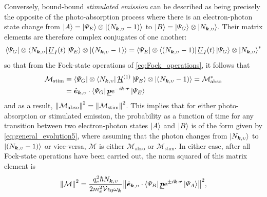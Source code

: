 Conversely, bound-bound \emph{stimulated emission} can be described as being precisely the opposite of the photo-absorption process where there is an electron-photon state change from $\ket{A} = \ket{\Psi_E} \otimes \ket{\left( N_{\mathbold{k},\upsilon} -1 \right)}$ to $\ket{B} = \ket{\Psi_G} \otimes \ket{N_{\mathbold{k},\upsilon}}$. 
Their matrix elements are therefore complex conjugates of one another:
\begin{equation}
\bra{\Psi_G} \otimes \bra{N_{\mathbold{k},\upsilon}} \underline{U}_I (t) \ket{\Psi_E} \otimes \ket{\left( N_{\mathbold{k},\upsilon} -1 \right)} = \bra{\Psi_E} \otimes \bra{\left( N_{\mathbold{k},\upsilon} -1 \right)} \underline{U}_I (t) \ket{\Psi_G} \otimes \ket{N_{\mathbold{k},\upsilon}}^* 
 \end{equation}
so that from the Fock-state operations of \cref{eq:Fock_operations}, it follows that
\begin{align}\label{eq:abso_stim_balance}
 \begin{split}
 \mathcal{M}_{\text{stim}} &\equiv \bra{\Psi_G} \otimes \bra{N_{\mathbold{k},\upsilon}} \underline{\mathcal{H}}^{(1)} \ket{\Psi_E} \otimes \ket{\left( N_{\mathbold{k},\upsilon} - 1 \right)} = \mathcal{M}_{\text{abso}}^* \\
 &= \hat{\mathbold{e}}_{\mathbold{k},\upsilon} \cdot \bra{\Psi_G} \underline{\mathbold{p}} \mathrm{e}^{ -i \mathbold{k} \cdot \mathbold{r}} \ket{\Psi_E}
 \end{split}
 \end{align}
and as a result, $\norm{\mathcal{M}_{\text{abso}}}^2 = \norm{\mathcal{M}_{\text{stim}}}^2$. 
This implies that for either photo-absorption or stimulated emission, the probability as a function of time for any transition between two electron-photon states $\ket{A}$ and $\ket{B}$ is of the form given by \cref{eq:general_evolution5}, where assuming that the photon changes from $\ket{N_{\mathbold{k},\upsilon}}$ to $\ket{\left( N_{\mathbold{k},\upsilon} - 1 \right)}$ or vice-versa, $\mathcal{M}$ is either $\mathcal{M}_{\text{abso}}$ or $\mathcal{M}_{\text{stim}}$. 
In either case, after all Fock-state operations have been carried out, the norm squared of this matrix element is 
\begin{equation}\label{eq:abso_stim_matrix_element}
 \norm{\mathcal{M}}^2 = \frac{q_e^2 \hbar N_{\mathbold{k},\upsilon}}{2 m_e^2 \mathcal{V} \epsilon_0 \omega_{\mathbold{k}}} \norm{\hat{\mathbold{e}}_{\mathbold{k},\upsilon} \cdot \bra{\Psi_B} \underline{\mathbold{p}} \mathrm{e}^{\pm i \mathbold{k} \cdot \mathbold{r}} \ket{\Psi_A}}^2 ,
 \end{equation}
